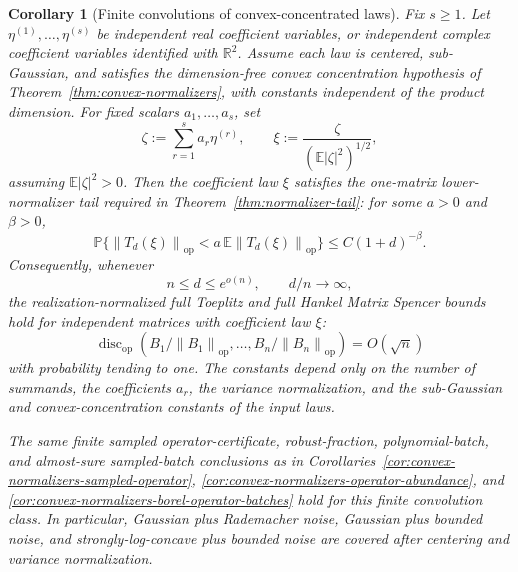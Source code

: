 \documentclass[11pt]{amsart}
\numberwithin{equation}{section}
\newtheorem{corollary}[theorem]{Corollary}
\theoremstyle{definition}
\theoremstyle{remark}
\newcommand{\R}{\mathbb R}
\newcommand{\op}{\mathrm{op}}
\newcommand{\discop}{\operatorname{disc}_{\op}}
\newcommand{\Prob}{\mathbb P}
\newcommand{\Exp}{\mathbb E}
\newcommand{\norm}[1]{\left\lVert #1\right\rVert}
\begin{document}
\begin{corollary}[Finite convolutions of convex-concentrated laws]
\label{cor:convex-convolution-normalizers}
Fix \(s\ge1\).  Let \(\eta^{(1)},\ldots,\eta^{(s)}\) be independent real
coefficient variables, or independent complex coefficient variables identified
with \(\R^2\).  Assume each law is centered, sub-Gaussian, and satisfies the
dimension-free convex concentration hypothesis of
Theorem~\ref{thm:convex-normalizers}, with constants independent of the product
dimension.  For fixed scalars \(a_1,\ldots,a_s\), set
\[
  \zeta:=\sum_{r=1}^s a_r\eta^{(r)},\qquad
  \xi:=\frac{\zeta}{(\Exp|\zeta|^2)^{1/2}},
\]
assuming \(\Exp|\zeta|^2>0\).  Then the coefficient law \(\xi\) satisfies the
one-matrix lower-normalizer tail required in
Theorem~\ref{thm:normalizer-tail}: for some \(a>0\) and \(\beta>0\),
\[
  \Prob\{\norm{T_d(\xi)}_{\op}<a\,\Exp\norm{T_d(\xi)}_{\op}\}
  \le C(1+d)^{-\beta}.
\]
Consequently, whenever
\[
  n\le d\le e^{o(n)},\qquad d/n\to\infty,
\]
the realization-normalized full Toeplitz and full Hankel Matrix Spencer bounds
hold for independent matrices with coefficient law \(\xi\):
\[
  \discop(B_1/\norm{B_1}_{\op},\ldots,B_n/\norm{B_n}_{\op})
  =O(\sqrt n)
\]
with probability tending to one.  The constants depend only on the number of
summands, the coefficients \(a_r\), the variance normalization, and the
sub-Gaussian and convex-concentration constants of the input laws.

The same finite sampled operator-certificate, robust-fraction,
polynomial-batch, and almost-sure sampled-batch conclusions as in
Corollaries~\ref{cor:convex-normalizers-sampled-operator},
\ref{cor:convex-normalizers-operator-abundance}, and
\ref{cor:convex-normalizers-borel-operator-batches} hold for this finite
convolution class.  In particular, Gaussian plus Rademacher noise, Gaussian
plus bounded noise, and strongly-log-concave plus bounded noise are covered
after centering and variance normalization.
\end{corollary}
\end{document}
